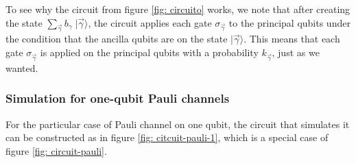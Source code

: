 To see why the circuit from figure \ref{fig: circuito}
 works, 
we note that after creating the state 
$\sum_{\vec{\gamma}} b_{\gamma} \; |\vec{\gamma} \rangle$, 
the circuit applies each gate $\sigma_{\vec{\gamma}}$ to the principal qubits 
under the condition that the ancilla qubits are 
on the state $|\vec{\gamma}\rangle$. 
This  means that each gate $\sigma_{\vec{\gamma}}$ is applied 
on the principal qubits with a probability $k_{\vec{\gamma}}$, 
just as we wanted.  \\

\subsubsection{Simulation for one-qubit Pauli channels}
\label{subsec: Simulation for one-qubit Pauli channels}
For the particular case of Pauli channel on one qubit, 
the circuit that simulates it can be constructed as in figure 
\ref{fig: citcuit-pauli-1}, which is a special case of figure \ref{fig: circuit-pauli}.

